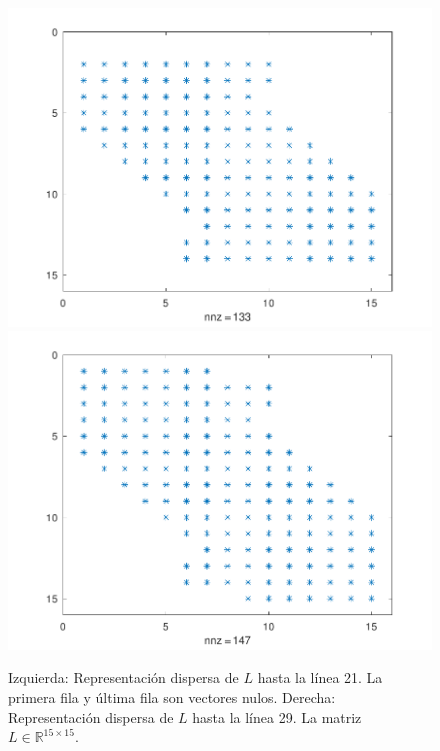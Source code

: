 \begin{problem}
\begin{figure}[ht!]
    \centering
    \includegraphics[width=.39\paperwidth]{../examples/octave/elliptic1Dsparsebefore.pdf}
    \includegraphics[width=.39\paperwidth]{../examples/octave/elliptic1Dsparseafter.pdf}
    \caption{Izquierda: Representación dispersa de $L$ hasta la línea 21.
        La primera fila y última fila son vectores nulos.
        Derecha: Representación dispersa de $L$ hasta la línea 29.
        La matriz $L\in\mathbb{R}^{15\times 15}$.}
\end{figure}


\end{problem}
